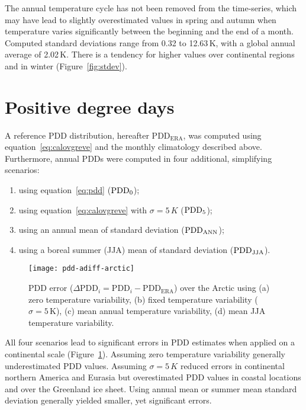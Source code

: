 \documentclass[review]{igs}
\begin{document}
The annual temperature cycle has not been removed from the time-series, which may have lead to slightly overestimated values in spring and autumn when temperature varies significantly between the beginning and the end of a month. Computed standard deviations range from 0.32 to 12.63\,K, with a global annual average of 2.02\,K. There is a tendency for higher values over continental regions and in winter (Figure~\ref{fig:stdev}).


\section{Positive degree days}

A reference PDD distribution, hereafter $\mathrm{PDD_{ERA}}$, was computed using equation~\ref{eq:calovgreve} and the monthly climatology described above. Furthermore, annual PDDs were computed in four additional, simplifying scenarios:

\begin{enumerate}
  \item using equation~\ref{eq:pdd} ($\rm PDD_0$);
  \item using equation~\ref{eq:calovgreve} with $\sigma=5\,K$ ($\rm PDD_5$);
  \item using an annual mean of standard deviation ($\rm PDD_{ANN}$);
  \item using a boreal summer (JJA) mean of standard deviation ($\rm PDD_{JJA}$).
\end{enumerate}

\begin{figure}
  \centering\texttt{[image: pdd-adiff-arctic]}
  \caption{PDD error ($\Delta\mathrm{PDD}_i = \mathrm{PDD}_i - \mathrm{PDD_{ERA}}$) over the Arctic using (a) zero temperature variability, (b) fixed temperature variability ($\sigma=5\,\mathrm{K}$), (c) mean annual temperature variability, (d) mean JJA temperature variability.}
  \label{fig:pdd}
\end{figure}

All four scenarios lead to significant errors in PDD estimates when applied on a continental scale (Figure~\ref{fig:pdd}). Assuming zero temperature variability generally underestimated PDD values. Assuming $\sigma=5\,K$ reduced errors in continental northern America and Eurasia but overestimated PDD values in coastal locations and over the Greenland ice sheet. Using annual mean or summer mean standard deviation generally yielded smaller, yet significant errors.
\end{document}
